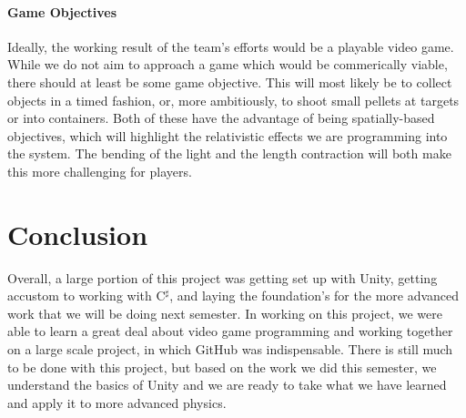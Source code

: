 \documentclass[12pt]{article}
\newcommand{\csharp}{C$^\sharp$}
\begin{document}
\paragraph{Game Objectives}
Ideally, the working result of the team's efforts would be a playable video game. While we do not aim to approach a game which would be commerically viable, there should at least be some game objective. This will most likely be to collect objects in a timed fashion, or, more ambitiously, to shoot small pellets at targets or into containers. Both of these have the advantage of being spatially-based objectives, which will highlight the relativistic effects we are programming into the system. The bending of the light and the length contraction will both make this more challenging for players.

\section{Conclusion}
Overall, a large portion of this project was getting set up with Unity, getting accustom to working with \csharp{}, and laying the foundation's for the more advanced work that we will be doing next semester. In working on this project, we were able to learn a great deal about video game programming and working together on a large scale project, in which GitHub was indispensable. There is still much to be done with this project, but based on the work we did this semester, we understand the basics of Unity and we are ready to take what we have learned and apply it to more advanced physics. 
 
\end{document}
